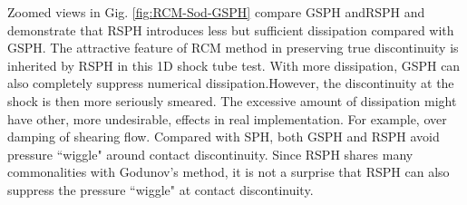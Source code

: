 \documentclass[review]{elsarticle}
\begin{document}
Zoomed views in Gig. \ref{fig:RCM-Sod-GSPH} compare GSPH andRSPH and demonstrate that RSPH introduces less but sufficient dissipation compared with GSPH. The attractive feature of RCM method in preserving true discontinuity is inherited by RSPH in this 1D shock tube test. With more dissipation, GSPH can also completely suppress numerical dissipation.However, the discontinuity at the shock is then more seriously smeared. The excessive amount of dissipation might have other, more undesirable, effects in real implementation. For example, over damping of shearing flow. Compared with SPH, both GSPH and RSPH avoid pressure ``wiggle" around contact discontinuity. Since RSPH shares many commonalities   with Godunov's method, it is not a surprise that RSPH can also suppress the pressure ``wiggle" at contact discontinuity.
\end{document}

